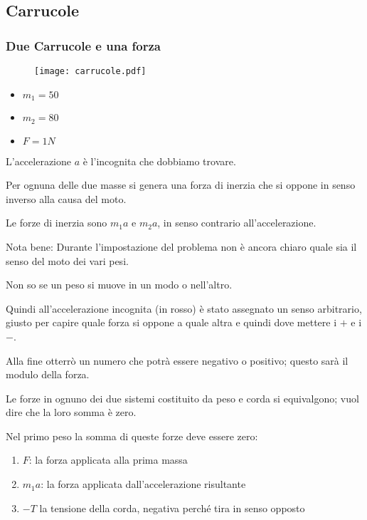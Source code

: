 \subsection{Carrucole}

\subsubsection{Due Carrucole e una forza}

\begin{figure}[h]
\centering
\texttt{[image: carrucole.pdf]}
\end{figure}

\begin{itemize}
\item $m_1=50$
\item $m_2=80$
\item $F=1N$
\end{itemize}

L'accelerazione $a$ è l'incognita che dobbiamo trovare.

Per ognuna delle due masse si genera una forza di inerzia che si oppone in senso inverso alla causa del moto.

Le forze di inerzia sono $m_1a$ e $m_{2}a$, in senso contrario all'accelerazione.

Nota bene: Durante l'impostazione del problema non è ancora chiaro quale sia il senso del moto dei vari pesi.

Non so se un peso si muove in un modo o nell'altro.

Quindi all'accelerazione incognita (in rosso) è stato assegnato un senso arbitrario, giusto per capire quale forza si oppone a quale altra e quindi dove mettere i $+$ e i $-$.

Alla fine otterrò un numero che potrà essere negativo o positivo; questo sarà il modulo della forza.

Le forze in ognuno dei due sistemi costituito da peso e corda si equivalgono; vuol dire che la loro somma è zero.

Nel primo peso la somma di queste forze deve essere zero:

\begin{enumerate}
\item $F$: la forza applicata alla prima massa
\item $m_1a$: la forza applicata dall'accelerazione risultante
\item $-T$ la tensione della corda, negativa perché tira in senso opposto
\end{enumerate}

